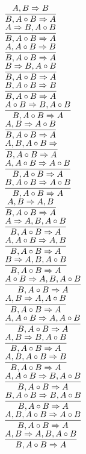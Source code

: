 \documentclass[11pt]{article}
\begin{document}
\begin{center}
\bigskip
\\$\infer{B, A\circ B\Rightarrow A}{A, B\Rightarrow B}$
\bigskip
\\$\infer{B, A\circ B\Rightarrow A}{A\Rightarrow B, A\circ B}$
\bigskip
\\$\infer{B, A\circ B\Rightarrow A}{A, A\circ B\Rightarrow B}$
\bigskip
\\$\infer{B, A\circ B\Rightarrow A}{B\Rightarrow B, A\circ B}$
\bigskip
\\$\infer{B, A\circ B\Rightarrow A}{B, A\circ B\Rightarrow B}$
\bigskip
\\$\infer{B, A\circ B\Rightarrow A}{A\circ B\Rightarrow B, A\circ B}$
\bigskip
\\$\infer{B, A\circ B\Rightarrow A}{A, B\Rightarrow A\circ B}$
\bigskip
\\$\infer{B, A\circ B\Rightarrow A}{A, B, A\circ B\Rightarrow }$
\bigskip
\\$\infer{B, A\circ B\Rightarrow A}{A, A\circ B\Rightarrow A\circ B}$
\bigskip
\\$\infer{B, A\circ B\Rightarrow A}{B, A\circ B\Rightarrow A\circ B}$
\bigskip
\\$\infer{B, A\circ B\Rightarrow A}{A, B\Rightarrow A, B}$
\bigskip
\\$\infer{B, A\circ B\Rightarrow A}{A\Rightarrow A, B, A\circ B}$
\bigskip
\\$\infer{B, A\circ B\Rightarrow A}{A, A\circ B\Rightarrow A, B}$
\bigskip
\\$\infer{B, A\circ B\Rightarrow A}{B\Rightarrow A, B, A\circ B}$
\bigskip
\\$\infer{B, A\circ B\Rightarrow A}{A\circ B\Rightarrow A, B, A\circ B}$
\bigskip
\\$\infer{B, A\circ B\Rightarrow A}{A, B\Rightarrow A, A\circ B}$
\bigskip
\\$\infer{B, A\circ B\Rightarrow A}{A, A\circ B\Rightarrow A, A\circ B}$
\bigskip
\\$\infer{B, A\circ B\Rightarrow A}{A, B\Rightarrow B, A\circ B}$
\bigskip
\\$\infer{B, A\circ B\Rightarrow A}{A, B, A\circ B\Rightarrow B}$
\bigskip
\\$\infer{B, A\circ B\Rightarrow A}{A, A\circ B\Rightarrow B, A\circ B}$
\bigskip
\\$\infer{B, A\circ B\Rightarrow A}{B, A\circ B\Rightarrow B, A\circ B}$
\bigskip
\\$\infer{B, A\circ B\Rightarrow A}{A, B, A\circ B\Rightarrow A\circ B}$
\bigskip
\\$\infer{B, A\circ B\Rightarrow A}{A, B\Rightarrow A, B, A\circ B}$

\end{center}
\end{document}
